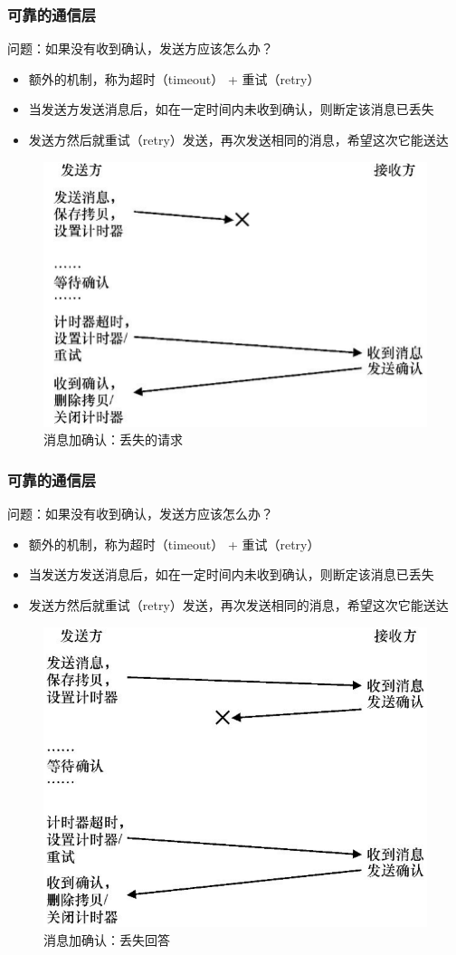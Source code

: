 \begin{frame}[fragile]
    \frametitle{可靠的通信层}
    问题：如果没有收到确认，发送方应该怎么办？
    \begin{itemize}
        \item 额外的机制，称为超时（timeout） + 重试（retry）
        \item  当发送方发送消息后，如在一定时间内未收到确认，则断定该消息已丢失
        \item  发送方然后就重试（retry）发送，再次发送相同的消息，希望这次它能送达
    \end{itemize}

    \begin{figure}
        \includegraphics[width=0.4\linewidth]{figs/timeout.png}
          \caption{消息加确认：丢失的请求}
    \end{figure}
\end{frame}


\begin{frame}[fragile]
    \frametitle{可靠的通信层}
    问题：如果没有收到确认，发送方应该怎么办？
    \begin{itemize}
        \item 额外的机制，称为超时（timeout） + 重试（retry）
        \item  当发送方发送消息后，如在一定时间内未收到确认，则断定该消息已丢失
        \item  发送方然后就重试（retry）发送，再次发送相同的消息，希望这次它能送达
    \end{itemize}
    
    \begin{figure}
        \includegraphics[width=0.35\linewidth]{figs/timeout-answer.png}
        \caption{消息加确认：丢失回答}
    \end{figure}
\end{frame}

